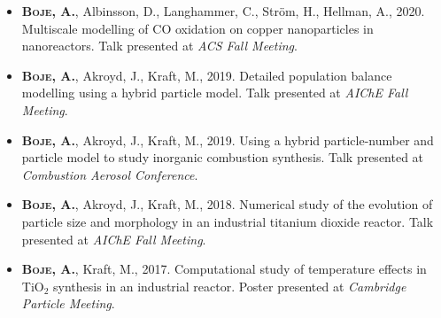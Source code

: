 \documentclass[11pt,a4paper,sans]{moderncv}   %
\def\addls{\vspace{2pt}}
\begin{document}
\begin{itemize}
		\addls
		
		\item{\textbf{\textsc{Boje}, A.}, Albinsson, D., Langhammer, C., Str\"om, H., Hellman, A., 2020. Multiscale modelling of CO oxidation on copper nanoparticles in nanoreactors. Talk presented at \textit{ACS Fall Meeting}.}

		\addls

		\item{\textbf{\textsc{Boje}, A.}, {Akroyd}, J., {Kraft}, M., 2019. Detailed population balance modelling using a hybrid particle model. Talk presented at \textit{AIChE Fall Meeting}.}
		
		\addls
		
		\item{\textbf{\textsc{Boje}, A.}, {Akroyd}, J., {Kraft}, M., 2019. Using a hybrid particle-number and particle model to study inorganic combustion synthesis. Talk presented at \textit{Combustion Aerosol Conference}.}
		
		\addls
		
		\item{\textbf{\textsc{Boje}, A.}, {Akroyd}, J., {Kraft}, M., 2018. Numerical study of the evolution of particle size and morphology in an industrial titanium dioxide reactor. Talk presented at \textit{AIChE Fall Meeting}.}
		
		\addls
		
		\item{\textbf{\textsc{Boje}, A.}, {Kraft}, M., 2017. Computational study of temperature effects in TiO$_2$ synthesis in an industrial reactor. Poster presented at \textit{Cambridge Particle Meeting}.}
		
	\end{itemize}
	
	
\end{document}
